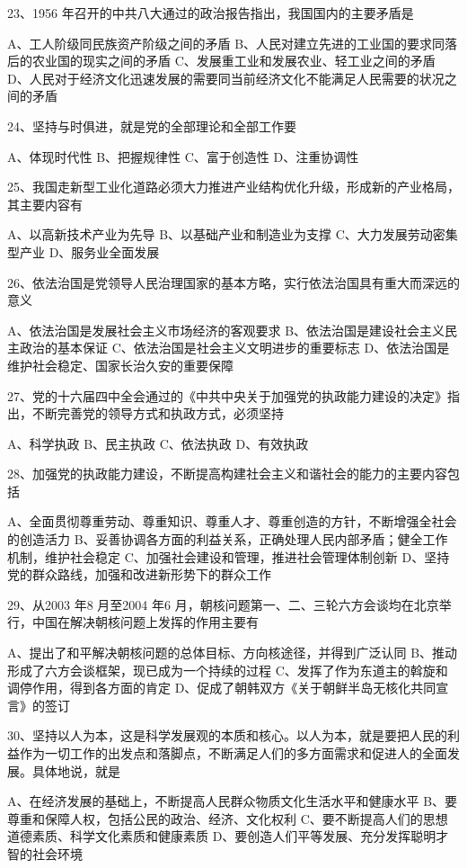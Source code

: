 \documentclass[UTF8,11pt]{ctexart}
\begin{document}
23、1956 年召开的中共八大通过的政治报告指出，我国国内的主要矛盾是


A、工人阶级同民族资产阶级之间的矛盾 B、人民对建立先进的工业国的要求同落后的农业国的现实之间的矛盾 C、发展重工业和发展农业、轻工业之间的矛盾 D、人民对于经济文化迅速发展的需要同当前经济文化不能满足人民需要的状况之间的矛盾


24、坚持与时俱进，就是党的全部理论和全部工作要


A、体现时代性 B、把握规律性 C、富于创造性 D、注重协调性


25、我国走新型工业化道路必须大力推进产业结构优化升级，形成新的产业格局，其主要内容有


A、以高新技术产业为先导 B、以基础产业和制造业为支撑 C、大力发展劳动密集型产业 D、服务业全面发展


26、依法治国是党领导人民治理国家的基本方略，实行依法治国具有重大而深远的意义


A、依法治国是发展社会主义市场经济的客观要求 B、依法治国是建设社会主义民主政治的基本保证 C、依法治国是社会主义文明进步的重要标志 D、依法治国是维护社会稳定、国家长治久安的重要保障


27、党的十六届四中全会通过的《中共中央关于加强党的执政能力建设的决定》指出，不断完善党的领导方式和执政方式，必须坚持


A、科学执政 B、民主执政 C、依法执政 D、有效执政


28、加强党的执政能力建设，不断提高构建社会主义和谐社会的能力的主要内容包括


A、全面贯彻尊重劳动、尊重知识、尊重人才、尊重创造的方针，不断增强全社会的创造活力 B、妥善协调各方面的利益关系，正确处理人民内部矛盾；健全工作机制，维护社会稳定 C、加强社会建设和管理，推进社会管理体制创新 D、坚持党的群众路线，加强和改进新形势下的群众工作


29、从2003 年8 月至2004 年6 月，朝核问题第一、二、三轮六方会谈均在北京举行，中国在解决朝核问题上发挥的作用主要有


A、提出了和平解决朝核问题的总体目标、方向核途径，并得到广泛认同 B、推动形成了六方会谈框架，现已成为一个持续的过程 C、发挥了作为东道主的斡旋和调停作用，得到各方面的肯定 D、促成了朝韩双方《关于朝鲜半岛无核化共同宣言》的签订


30、坚持以人为本，这是科学发展观的本质和核心。以人为本，就是要把人民的利益作为一切工作的出发点和落脚点，不断满足人们的多方面需求和促进人的全面发展。具体地说，就是


A、在经济发展的基础上，不断提高人民群众物质文化生活水平和健康水平 B、要尊重和保障人权，包括公民的政治、经济、文化权利 C、要不断提高人们的思想道德素质、科学文化素质和健康素质 D、要创造人们平等发展、充分发挥聪明才智的社会环境
\end{document}
